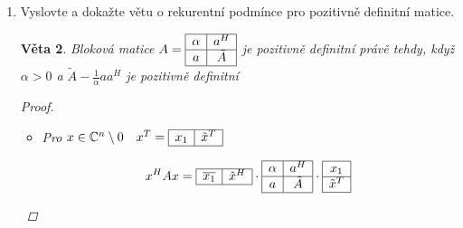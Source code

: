 \documentclass[10pt,a4paper]{article}
\theoremstyle{plain}
\newtheorem{veta}{Věta}
\begin{document}
\begin{enumerate}
\begin{veta}
\begin{proof}
\begin{itemize}
Nechť $x$ je netriviální vlastní vektor, který odpovídá vlastnímu číslu $\lambda$.

Pak $0 < x^HAx =  \lambda x^Hx = \lambda \langle x | x \rangle$

$\langle x | x \rangle > 0 \implies \lambda > 0$

\item[$2 \implies 3$]
$A$ je hermitovská $\implies$ existuje unitární $R$ a diagonální $D$, t.ž. $A = R^HDR$.

Vezměme diagonální $D^\prime: d^\prime_{i,i} = \sqrt{d_{i,i}}$ a $U = D^\prime R$.

Nyní \[ U^HU =  R^H D^{\prime H} D^\prime R = R^HDR = A\]

$U$ je regulární, protože diagonální i unitární matice jsou regulární.
\item[$3 \implies 1$]
Pokud $x \in \mathbb{C}^n \setminus 0$, pak $Ux \neq 0$, protože $U$ je regulární.

$x^HAx = x^HU^H Ux = (Ux)^H Ux = \langle Ux | Ux \rangle > 0 $

\end{itemize}\end{proof}
\end{veta}

\item Vyslovte a dokažte větu o rekurentní podmínce pro pozitivně definitní matice.

\begin{veta}
Bloková matice $A = \begin{array}{|c|c|} \hline  \alpha & a^H  \\ \hline  a & \tilde{A} \\ \hline \end{array}$ je pozitivně definitní právě tehdy, když $\alpha > 0$ a $\tilde{A} - \frac1\alpha a a^H$ je pozitivně definitní
\begin{proof} $\ $
\begin{itemize}
\item[$\impliedby$]
Pro $x \in \mathbb{C}^n \setminus 0 \quad x^T = \begin{array}{|c|c|} \hline x_1 & \tilde{x}^T \\ \hline \end{array}$


\[ x^HAx = \begin{array}{|c|c|} \hline \overline{x_1} & \tilde{x}^H \\ \hline \end{array} \cdot \begin{array}{|c|c|} \hline  \alpha & a^H  \\ \hline  a & \tilde{A} \\ \hline \end{array} \cdot \begin{array}{|c|} \hline x_1  \\ \hline \tilde{x}^T \\ \hline \end{array} \]


\end{itemize}
\end{proof}
\end{veta}
\end{enumerate}
\end{document}
